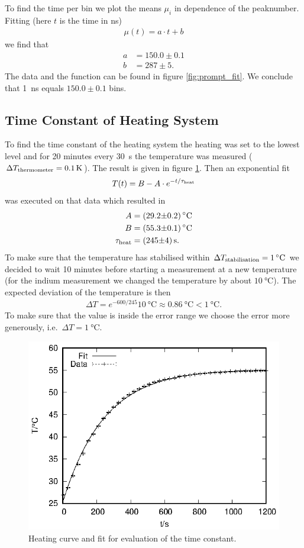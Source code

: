 To find the time per bin we plot the means $\mu_i$ in dependence of the peaknumber. Fitting (here $t$ is the time in \si{\nano\second}) 
\begin{align*}
  \mu(t)=a\cdot t+b
\end{align*}
we find that
\begin{align*}
  a&=150.0 \pm 0.1\\
  b&=287 \pm 5.
\end{align*} 
The data and the function can be found in figure \ref{fig:prompt_fit}. We conclude that \SI{1}{\nano\second} equals $150.0 \pm 0.1$ bins.

\subsection{Time Constant of Heating System}
To find the time constant of the heating system the heating was set to the lowest level and for 20 minutes every \SI{30}{\second} the temperature was measured ($\Delta T\ind{thermometer} = \SI{0.1}{\kelvin}$). The result is given in figure \ref{fig:heatcurve}. Then an exponential fit
\begin{align*}
 T(t)=B - A \cdot e^{-t/\tau\ind{heat}} 
\end{align*}
was executed on that data which resulted in 
\begin{align*}
A &= \SI[separate-uncertainty=true]{29.2(2)}{\celsius}\\
B &= \SI[separate-uncertainty=true]{55.3(1)}{\celsius}\\
\tau\ind{heat} &= \SI[separate-uncertainty=true]{245(4)}{\second}.
\end{align*}
To make sure that the temperature has stabilised within $\Delta T\ind{stabilisation} = \SI{1}{\celsius}$ we decided to wait 10 minutes before starting a measurement at a new temperature (for the indium measurement we changed the temperature by about $\SI{10}{\celsius}$). The expected deviation of the temperature is then 
\begin{align*}
\Delta T =e^{-600/245}\SI{10}{\celsius}  \approx \SI{0.86}{\celsius} < \SI{1}{\celsius}. 
\end{align*}
To make sure that the value is inside the error range we choose the error more generously, i.e.\ $\Delta T = \SI{1}{\celsius}$.

\begin{figure}[h]
\centering
\includegraphics[width=0.6\linewidth]{auswertung/heatcurve.eps}
\caption{Heating curve and fit for evaluation of the time constant.}
\label{fig:heatcurve}
\end{figure}

